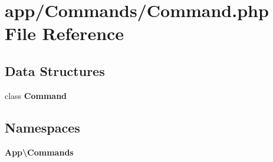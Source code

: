 \section{app/\+Commands/\+Command.php File Reference}
\label{app_2_commands_2_command_8php}
\subsection*{Data Structures}
\begin{DoxyCompactItemize}
\item 
class {\bf Command}
\end{DoxyCompactItemize}
\subsection*{Namespaces}
\begin{DoxyCompactItemize}
\item 
 {\bf App\textbackslash{}\+Commands}
\end{DoxyCompactItemize}
